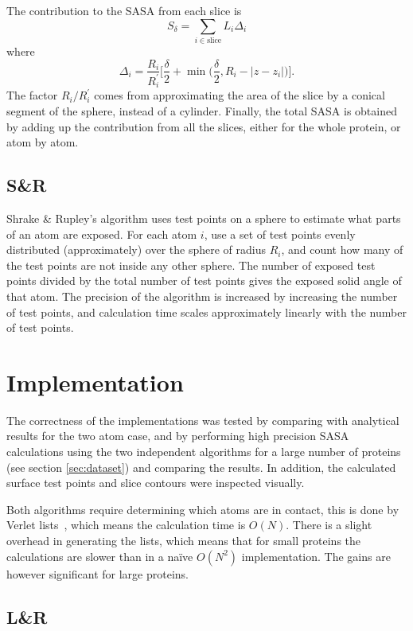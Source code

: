 \documentclass[a4paper,11pt]{article}
\begin{document}
\begin{small}
The contribution to the SASA from each slice is $$ S_\delta =
\sum_{i \in \text{slice}}L_i\Delta_i $$ where
$$
  \Delta_i = \frac{R_i}{R_i^\prime} \biggl[\frac{\delta}{2} 
    + \min\biggl(\frac{\delta}{2},R_i -
    \lvert z - z_i \rvert\biggr)\biggr]. 
$$ 
The factor $R_i/R_i^\prime$ comes from approximating the area of the
slice by a conical segment of the sphere, instead of a cylinder.
Finally, the total SASA is obtained by adding up the contribution from
all the slices, either for the whole protein, or atom by atom.

\subsection{S\&R}

Shrake \& Rupley's algorithm uses test points on a sphere to estimate
what parts of an atom are exposed. For each atom $i$, use a set of
test points evenly distributed (approximately) over the sphere of
radius $R_i$, and count how many of the test points are not inside any
other sphere. The number of exposed test points divided by the total
number of test points gives the exposed solid angle of that atom. The
precision of the algorithm is increased by increasing the number of
test points, and calculation time scales approximately linearly with
the number of test points.

\section{Implementation}\label{sec:imp}

The correctness of the implementations was tested by comparing with
analytical results for the two atom case, and by performing high
precision SASA calculations using the two independent algorithms for a
large number of proteins (see section \ref{sec:dataset}) and comparing
the results. In addition, the calculated surface test
points and slice contours were inspected visually.

Both algorithms require determining which atoms are in contact, this
is done by Verlet lists~\cite{Verlet}, which means the calculation
time is $O(N)$. There is a slight overhead in generating the lists,
which means that for small proteins the calculations are slower than
in a na\"{i}ve $O(N^2)$ implementation. The gains are however
significant for large proteins.

\subsection{L\&R}


\end{small}
\end{document}
